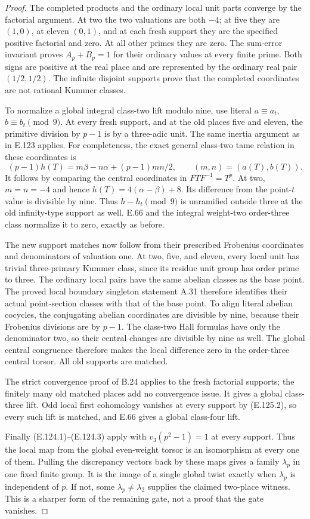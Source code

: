 \begin{proof}
The completed products and the ordinary local unit parts
converge by the factorial argument. At two the two valuations
are both $-4$; at five they are $(1,0)$, at eleven $(0,1)$,
and at each fresh support they are the specified positive
factorial and zero. At all other primes they are zero.
The sum-error invariant proves $A_p+B_p=1$ for their
ordinary values at every finite prime. Both signs are
positive at the real place and are represented by the
ordinary real pair $(1/2,1/2)$. The infinite disjoint
supports prove that the completed coordinates are not
rational Kummer classes.

To normalize a global integral class-two lift modulo nine,
use literal $a\equiv a_t$, $b\equiv b_t\pmod9$.
At every fresh support, and at the old places five and
eleven, the primitive division by $p-1$ is by a three-adic
unit. The same inertia argument as in E.123 applies.
For completeness, the exact general class-two tame relation
in these coordinates is
\[
 (p-1)h(T)=m\beta-n\alpha+(p-1)mn/2,
 \qquad (m,n)=(a(T),b(T)).
 \tag{E.125.6}
\]
It follows by comparing the central coordinates in
$F T F^{-1}=T^p$. At two, $m=n=-4$ and hence
$h(T)=4(\alpha-\beta)+8$. Its difference from the
point-$t$ value is divisible by nine. Thus $h-h_t\pmod9$
is unramified outside three at the old infinity-type
support as well. E.66 and the integral weight-two
order-three class normalize it to zero, exactly as before.

The new support matches now follow from their prescribed
Frobenius coordinates and denominators of valuation one.
At two, five, and eleven, every local unit has trivial
three-primary Kummer class, since its residue unit group
has order prime to three. The ordinary local pairs have
the same abelian classes as the base point. The proved
local boundary singleton statement A.31 therefore
identifies their actual point-section classes with that
of the base point. To align literal abelian cocycles,
the conjugating abelian coordinates are divisible by
nine, because their Frobenius divisions are by $p-1$.
The class-two Hall formulas have only the denominator
two, so their central changes are divisible by nine
as well. The global central congruence therefore makes
the local difference zero in the order-three central
torsor. All old supports are matched.

The strict convergence proof of B.24 applies to the
fresh factorial supports; the finitely many old matched
places add no convergence issue. It gives a global
class-three lift. Odd local first cohomology vanishes
at every support by (E.125.2), so every such lift is
matched, and E.66 gives a global class-four lift.

Finally (E.124.1)--(E.124.3) apply with
$v_3(p^2-1)=1$ at every support. Thus the local map
from the global even-weight torsor is an isomorphism
at every one of them. Pulling the discrepancy vectors
back by these maps gives a family $\lambda_p$ in one
fixed finite group. It is the image of a single global
twist exactly when $\lambda_p$ is independent of $p$.
If not, some $\lambda_p\ne\lambda_2$ supplies the
claimed two-place witness. This is a sharper form of
the remaining gate, not a proof that the gate vanishes.
\end{proof}

